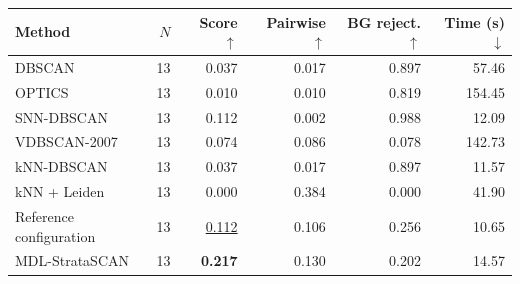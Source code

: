 \begin{tabular}{lrrrrr}
\toprule
Method & $N$ & Score $\uparrow$ & Pairwise $\uparrow$ & BG reject. $\uparrow$ & Time (s) $\downarrow$ \\
\midrule
DBSCAN & 13 & 0.037 & 0.017 & 0.897 & 57.46 \\
OPTICS & 13 & 0.010 & 0.010 & 0.819 & 154.45 \\
SNN-DBSCAN & 13 & 0.112 & 0.002 & 0.988 & 12.09 \\
VDBSCAN-2007 & 13 & 0.074 & 0.086 & 0.078 & 142.73 \\
kNN-DBSCAN & 13 & 0.037 & 0.017 & 0.897 & 11.57 \\
kNN + Leiden & 13 & 0.000 & 0.384 & 0.000 & 41.90 \\
Reference configuration & 13 & \underline{0.112} & 0.106 & 0.256 & 10.65 \\
MDL-StrataSCAN & 13 & \textbf{0.217} & 0.130 & 0.202 & 14.57 \\
\bottomrule
\end{tabular}
